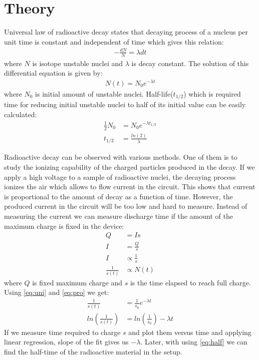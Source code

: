 \documentclass[reprint,amsmath,aps,nofootinbib,english]{revtex4-2}
\begin{document}
\section{Theory}
Universal law of radioactive decay states that decaying process of a nucleus per unit time is constant and independent of time which gives this relation:
\begin{align}
  -\frac{dN}{N} = \lambda dt
\end{align}
where $N$ is isotope unstable nuclei and $\lambda$ is decay constant. The solution of this differential equation is given by:
\begin{align}
  N(t) = N_0e^{-\lambda t} \label{eq:uni}
\end{align}
where $N_0$ is initial amount of unstable nuclei. Half-life($t_{1/2}$) which is required time for reducing initial unstable nuclei to half of its initial value can be easily calculated:
\begin{align}
  \frac{1}{2} N_0 &= N_0 e^{-\lambda t_{1/2}}\\
  t_{1/2} &= \frac{ln(2)}{\lambda} \label{eq:half}
\end{align}

Radioactive decay can be observed with various methods. One of them is to study the ionizing capability of the charged particles produced in the decay. If we apply a high voltage to a sample of radioactive nuclei, the decaying process ionizes the air which allows to flow current in the circuit. This shows that current is proportional to the amount of decay as a function of time. However, the produced current in the circuit will be too low and hard to measure. Instead of measuring the current we can measure discharge time if the amount of the maximum charge is fixed in the device: 
\begin{align}
  Q &= Is\\
  I &= \frac{Q}{s}\\
  I &\propto \frac{1}{s}\\
  \frac{1}{s(t)} &\propto N(t)\label{eq:pro}
\end{align}
where $Q$ is fixed maximum charge and $s$ is the time elapsed to reach full charge. Using \eqref{eq:uni} and \eqref{eq:pro} we get:
\begin{align}
  \frac{1}{s(t)} &= \frac{1}{s_0} e^{-\lambda t}\\
  ln\left(\frac{1}{s(t)}\right) &= ln\left(\frac{1}{s_0}\right) -\lambda t \label{eq:lneq}
\end{align}
If we measure time required to charge $s$ and plot them versus time and applying linear regression, slope of the fit gives us $-\lambda$. Later, with using \eqref{eq:half} we can find the half-time of the radioactive material in the setup.
\end{document}
